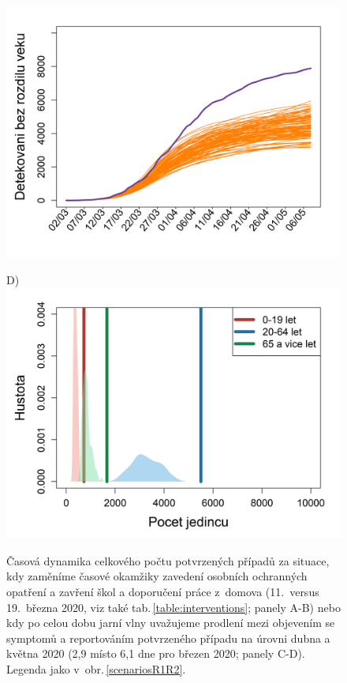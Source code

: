 \begin{figure}
\begin{center}
\begin{minipage}[m]{0.45\textwidth}
			\includegraphics[width = \textwidth]{pic/sc_testing.png}
		\end{minipage}
		\begin{minipage}[m]{0.45\textwidth}
			D) \\
			\includegraphics[width = \textwidth]{pic/sc_testing_PDF.png}
		\end{minipage}
	\end{center}
	\caption{Časová dynamika celkového počtu potvrzených případů za situace, kdy zaměníme časové okamžiky zavedení osobních ochranných opatření a zavření škol a doporučení práce z~domova  (11.\ versus 19.\ března 2020, viz také tab.\,\ref{table:interventions}; panely A-B) nebo kdy po celou dobu jarní vlny uvažujeme prodlení mezi objevením se symptomů a reportováním potvrzeného případu na úrovni dubna a května 2020 (2,9 místo 6,1 dne pro březen 2020; panely C-D). Legenda jako v~obr.\,\ref{scenariosR1R2}.}
	\label{switch}
\end{figure}

